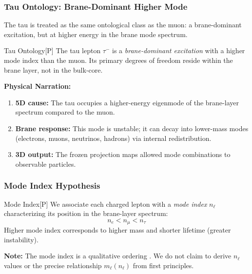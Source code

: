 \subsubsection{Tau Ontology: Brane-Dominant Higher Mode}

The tau is treated as the same ontological class as the muon: a brane-dominant excitation,
but at higher energy in the brane mode spectrum.

\begin{edcPostulateBox}{Tau Ontology}{[P]}
The tau lepton $\tau^-$ is a \emph{brane-dominant excitation} with a
higher mode index than the muon. Its primary degrees of freedom reside
within the brane layer, not in the bulk-core.
\end{edcPostulateBox}

\textbf{Physical Narration:}
\begin{enumerate}[nosep]
    \item \textbf{5D cause:} The tau occupies a higher-energy eigenmode of the
          brane-layer spectrum compared to the muon.
    \item \textbf{Brane response:} This mode is unstable; it can decay into
          lower-mass modes (electrons, muons, neutrinos, hadrons) via internal
          redistribution.
    \item \textbf{3D output:} The frozen projection maps allowed mode
          combinations to observable particles.
\end{enumerate}


\subsubsection{Mode Index Hypothesis}

\begin{edcDefinitionBox}{Mode Index}{[P]}
We associate each charged lepton with a \emph{mode index} $n_\ell$
characterizing its position in the brane-layer spectrum:
\[
    n_e < n_\mu < n_\tau
\]
Higher mode index corresponds to higher mass and shorter lifetime
(greater instability).
\end{edcDefinitionBox}

\textbf{Note:} The mode index is a qualitative ordering \tagP{}.
We do not claim to derive $n_\ell$ values or the precise relationship
$m_\ell(n_\ell)$ from first principles.

